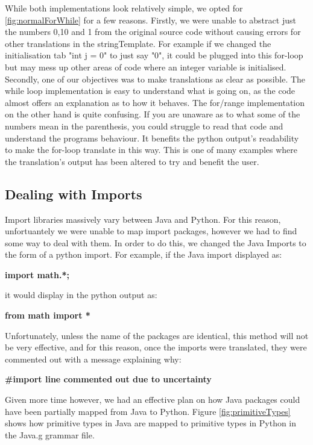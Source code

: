 \documentclass{l4proj}
\begin{document}
While both implementations look relatively simple, we opted for \ref{fig:normalForWhile} for a few reasons. Firstly, we were unable to abstract just the numbers 0,10 and 1 from the original source code without causing errors for other translations in the stringTemplate. For example if we changed the initialisation tab "int j = 0" to just say "0", it could be plugged into this for-loop but may mess up other areas of code where an integer variable is initialised.
Secondly, one of our objectives was to make translations as clear as possible. The while loop implementation is easy to understand what is going on, as the code almost offers an explanation as to how it behaves. The for/range implementation on the other hand is quite confusing. If you are unaware as to what some of the numbers mean in the parenthesis, you could struggle to read that code and understand the programs behaviour. It benefits the python output's readability to make the for-loop translate in this way.
This is one of many examples where the translation's output has been altered to try and benefit the user.

\subsection{Dealing with Imports}
Import libraries massively vary between Java and Python. For this reason, unfortuantely we were unable to map import packages, however we had to find some way to deal with them. In order to do this, we changed the Java Imports to the form of a python import. For example, if the Java import displayed as:

\textbf{import math.*;}

it would display in the python output as:

\textbf{from math import *}

Unfortunately, unless the name of the packages are identical, this method will not be very effective, and for this reason, once the imports were translated, they were commented out with a message explaining why:

\textbf{#import line commented out due to uncertainty}

Given more time however, we had an effective plan on how Java packages could have been partially mapped from Java to Python. Figure \ref{fig:primitiveTypes} shows how primitive types in Java are mapped to primitive types in Python in the Java.g grammar file.
\end{document}
